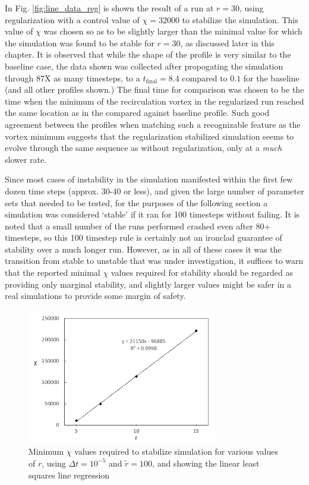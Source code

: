 In Fig. \ref{fig:line_data_reg} is shown the result of a run at $r=30$, using regularization with a control value of $\chi=32000$ to stabilize the simulation. This value of $\chi$ was chosen so as to be slightly larger than the minimal value for which the simulation was found to be stable for $r=30$, as discussed later in this chapter. It is observed that while the shape of the profile is very similar to the baseline case, the data shown was collected after propogating the simulation through 87X as many timesteps, to a $t_\mathrm{final}=8.4$ compared to $0.1$ for the baseline (and all other profiles shown.) The final time for comparison was chosen to be the time when the minimum of the recirculation vortex in the regularized run reached the same location as in the compared against baseline profile. Such good agreement between the profiles when matching such a recognizable feature as the vortex minimum suggests that the regularization stabilized simulation seems to evolve through the same sequence as without regularization, only at a \emph{much} slower rate.

Since most cases of instability in the simulation manifested within the first few dozen time steps (approx. 30-40 or less), and given the large number of parameter sets that needed to be tested, for the purposes of the following section a simulation was considered `stable' if it ran for 100 timesteps without failing. It is noted that a small number of the runs performed crashed even after 80+ timesteps, so this 100 timestep rule is certainly not an ironclad guarantee of stability over a much longer run. However, as in all of these cases it was the transition from stable to unstable that was under investigation, it suffices to warn that the reported minimal $\chi$ values required for stability should be regarded as providing only marginal stability, and slightly larger values might be safer in a real simulations to provide some margin of safety.

\begin{figure}[!tb]
\centering
\includegraphics[width=0.75\textwidth]{figures/min_chi_dt5_r100.pdf}
\caption{Minimum $\chi$ values required to stabilize simulation for various values of $r$, using $\Delta t=10^{-5}$ and $\tilde{r}=100$, and showing the linear least squares line regression}
\label{fig:min_chi_dt5_r100}
\end{figure}

